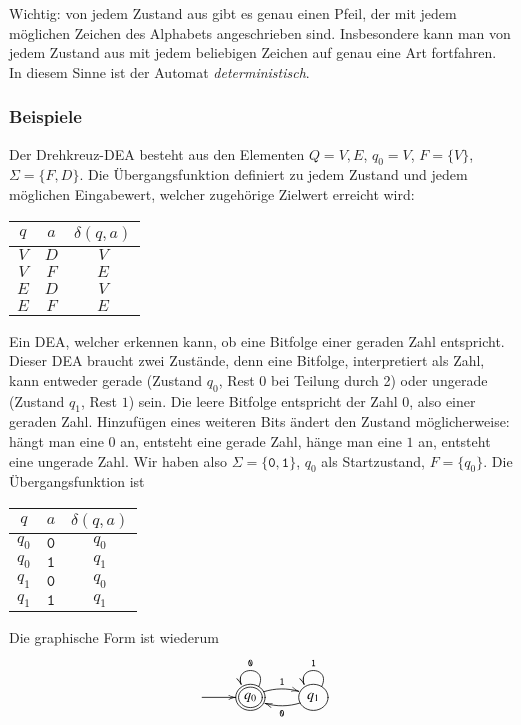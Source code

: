 Wichtig: von jedem Zustand aus gibt es genau einen Pfeil, der mit jedem möglichen
Zeichen des Alphabets angeschrieben sind.
Insbesondere kann man von jedem
Zustand aus mit jedem beliebigen Zeichen auf genau eine Art fortfahren.
%
In diesem Sinne ist der Automat {\em deterministisch}.

\subsubsection{Beispiele}
\begin{beispiel}[\bf Drehkreuz]
Der Drehkreuz-DEA besteht aus den Elementen $Q={V,E}$, $q_0=V$,
$F=\{V\}$, $\Sigma=\{F,D\}$.
Die Übergangsfunktion definiert zu jedem Zustand und jedem möglichen
Eingabewert, welcher zugehörige Zielwert erreicht wird:
\begin{center}
\begin{tabular}{|cc|c|}
\hline
$q$&$a$&$\delta(q,a)$\\
\hline
$V$&$D$&$V$\\
$V$&$F$&$E$\\
$E$&$D$&$V$\\
$E$&$F$&$E$\\
\hline
\end{tabular}
\end{center}
\end{beispiel}
\begin{beispiel}
Ein DEA, welcher erkennen kann, ob eine Bitfolge einer geraden Zahl entspricht.
Dieser DEA braucht zwei Zustände, denn eine Bitfolge, interpretiert
als Zahl, kann entweder gerade (Zustand $q_0$, Rest $0$ bei Teilung durch 2)
oder ungerade (Zustand $q_1$, Rest $1$) sein.
Die leere Bitfolge entspricht der Zahl $0$, also einer geraden Zahl.
Hinzufügen eines weiteren
Bits ändert den Zustand möglicherweise: hängt man eine $0$ an, entsteht
eine gerade Zahl, hänge man eine $1$ an, entsteht eine ungerade Zahl.
Wir haben also $\Sigma=\{\texttt{0},\texttt{1}\}$, $q_0$ als Startzustand,
$F=\{q_0\}$.
Die Übergangsfunktion ist
\begin{center}
\begin{tabular}{|cc|c|}
\hline
$q$&$a$&$\delta(q,a)$\\
\hline
$q_0$&$\texttt{0}$&$q_0$\\
$q_0$&$\texttt{1}$&$q_1$\\
$q_1$&$\texttt{0}$&$q_0$\\
$q_1$&$\texttt{1}$&$q_1$\\
\hline
\end{tabular}
\end{center}
Die graphische Form ist wiederum
\[
\entrymodifiers={++[o][F]}
\xymatrix{
*+\txt{}\ar[r]
	&*++[o][F=]{q_0} \ar@/^/[r]^{\texttt{1}} \ar@(ur,ul)_{\texttt{0}}
		&{q_1} \ar@/^/[l]^{\texttt{0}} \ar@(ur,ul)_{\texttt{1}}
}
\]
\end{beispiel}
